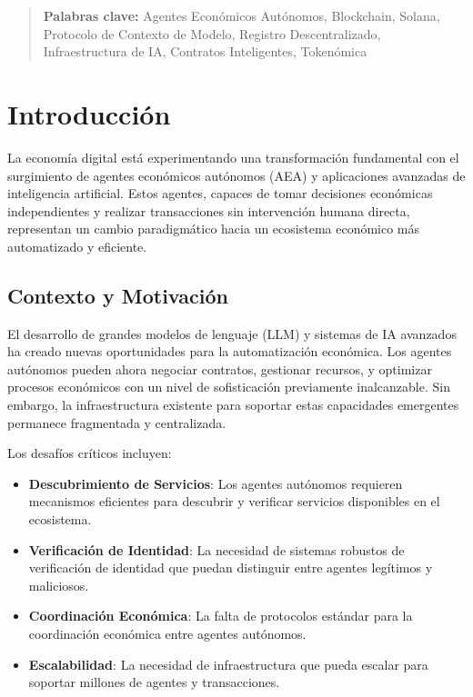 \documentclass[12pt,a4paper]{article}
\begin{document}
\begin{abstract}
\textbf{Palabras clave:} Agentes Económicos Autónomos, Blockchain, Solana, Protocolo de Contexto de Modelo, Registro Descentralizado, Infraestructura de IA, Contratos Inteligentes, Tokenómica
\end{abstract}

\newpage
\tableofcontents
\newpage

\section{Introducción}

La economía digital está experimentando una transformación fundamental con el surgimiento de agentes económicos autónomos (AEA) y aplicaciones avanzadas de inteligencia artificial. Estos agentes, capaces de tomar decisiones económicas independientes y realizar transacciones sin intervención humana directa, representan un cambio paradigmático hacia un ecosistema económico más automatizado y eficiente.

\subsection{Contexto y Motivación}

El desarrollo de grandes modelos de lenguaje (LLM) y sistemas de IA avanzados ha creado nuevas oportunidades para la automatización económica. Los agentes autónomos pueden ahora negociar contratos, gestionar recursos, y optimizar procesos económicos con un nivel de sofisticación previamente inalcanzable. Sin embargo, la infraestructura existente para soportar estas capacidades emergentes permanece fragmentada y centralizada.

Los desafíos críticos incluyen:

\begin{itemize}
\item \textbf{Descubrimiento de Servicios}: Los agentes autónomos requieren mecanismos eficientes para descubrir y verificar servicios disponibles en el ecosistema.
\item \textbf{Verificación de Identidad}: La necesidad de sistemas robustos de verificación de identidad que puedan distinguir entre agentes legítimos y maliciosos.
\item \textbf{Coordinación Económica}: La falta de protocolos estándar para la coordinación económica entre agentes autónomos.
\item \textbf{Escalabilidad}: La necesidad de infraestructura que pueda escalar para soportar millones de agentes y transacciones.
\end{itemize}
\end{document}

